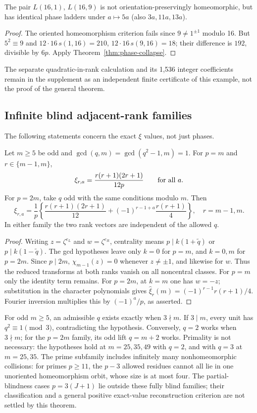 \begin{corollary}[The $p=16$ example]
The pair $L(16,1)$, $L(16,9)$ is not orientation-preservingly homeomorphic,
but has identical phase ladders under $a\mapsto5a$ (also $3a,11a,13a$).
\end{corollary}
\begin{proof}
The oriented homeomorphism criterion fails since $9\ne1^{\pm1}$ modulo 16.
But $5^2\equiv9$ and $12\cdot16\,s(1,16)=210$,
$12\cdot16\,s(9,16)=18$; their difference is $192$, divisible by $6p$.
Apply Theorem~\ref{thm:phase-collapse}.
\end{proof}
The separate quadratic-in-rank calculation
and its 1,536 integer coefficients remain in the supplement as an independent
finite certificate of this example, not the proof of the general theorem.

\subsection{Infinite blind adjacent-rank families}
The following statements concern the exact $\xi$ values, not just phases.
\begin{theorem}\label{thm:blind}
Let $m\geq5$ be odd and $\gcd(q,m)=\gcd(q^2-1,m)=1$.
For $p=m$ and $r\in\{m-1,m\}$,
\[
 \xi_{r,a}=\frac{r(r+1)(2r+1)}{12p}\qquad\hbox{for all }a.
\]
For $p=2m$, take $q$ odd with the same conditions modulo $m$. Then
\[
 \xi_{r,a}=\frac1p\left\{\frac{r(r+1)(2r+1)}{12}
       +(-1)^{r-1+a}\frac{r(r+1)}4\right\},\quad r=m-1,m.
\]
In either family the two rank vectors are independent of the allowed $q$.
\end{theorem}
\begin{proof}
Writing $z=\zeta^{e_L}$ and $w=\zeta^{e_R}$, centrality means
$p\mid k(1+\widetilde q)$ or $p\mid k(1-\widetilde q)$.
The gcd hypotheses leave only $k=0$ for $p=m$, and $k=0,m$ for $p=2m$.
Since $p\mid2m$, $\chi_{m-1}(z)=0$ whenever $z\ne\pm1$,
and likewise for $w$. Thus the reduced transforms at both ranks vanish
on all noncentral classes. For $p=m$ only the identity term remains.
For $p=2m$, at $k=m$ one has $w=-z$; substitution in the character
polynomials gives $\widehat\xi_r(m)=(-1)^{r-1}r(r+1)/4$.
Fourier inversion multiplies this by $(-1)^a/p$, as asserted.
\end{proof}
For odd $m\geq5$, an admissible $q$ exists exactly when $3\nmid m$.
If $3\mid m$, every unit has $q^2\equiv1\pmod3$, contradicting the
hypothesis. Conversely, $q=2$ works when $3\nmid m$; for the $p=2m$
family, its odd lift $q=m+2$ works. Primality is not necessary: the
hypotheses hold at $m=25,35,49$ with $q=2$, and with $q=3$ at $m=25,35$.
The prime subfamily includes infinitely many nonhomeomorphic collisions:
for primes $p\geq11$, the $p-3$ allowed residues cannot all lie in one
unoriented homeomorphism orbit, whose size is at most four.
The partial-blindness cases $p=3(J+1)$ lie outside these fully blind
families; their classification and a general positive exact-value
reconstruction criterion are not settled by this theorem.

